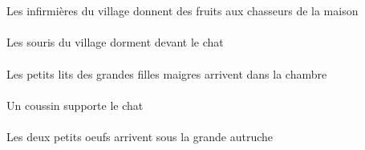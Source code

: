 \begin{exe}
\ex\gll
\DEFSgObl{}   \maisonDSgObl{}   \DE{}   \DEFPlErg{}    \DEFSgObl{}   \villageCSgObl{}   \DE{}   \infirmiereAPlErg{}    \DEFPlDat{}   \chasseurCPlDat{}   \INDPlAbs{}   \fruitAPlAbs{}  \donnerVdPrsAPl{}\\
\DEFSgOblP{}   \maisonDSgOblP{}   \DEP{}   \DEFPlErgP{}    \DEFSgOblP{}   \villageCSgOblP{}   \DEP{}   \infirmiereAPlErgP{}    \DEFPlDatP{}   \chasseurCPlDatP{}   \INDPlAbsP{}   \fruitAPlAbsP{}  \donnerVdPrsAPlP{}\\
Les infirmières du village donnent des fruits aux chasseurs de la maison
\ex\gll
\DEFPlAbs{}    \DEFSgObl{}   \villageCSgObl{}   \DE{}   \sourisBPlAbs{}    \DEFSgObl{}   \chatDSgObl{}   \DEVANT{}  \dormirViPrsBPl{}\\
\DEFPlAbsP{}    \DEFSgOblP{}   \villageCSgOblP{}   \DEP{}   \sourisBPlAbsP{}    \DEFSgOblP{}   \chatDSgOblP{}   \DEVANTP{}  \dormirViPrsBPlP{}\\
Les souris du village dorment devant le chat
\ex\gll
\DEFPlAbs{}    \DEFPlObl{}   \grandCPl{}   \maigreCPl{}   \filleCPlObl{}   \DE{}   \petitDPl{}   \litDPlAbs{}    \DEFSgObl{}   \chambreBSgObl{}   \DANS{}  \arriverViPrsDPl{}\\
\DEFPlAbsP{}    \DEFPlOblP{}   \grandCPlP{}   \maigreCPlP{}   \filleCPlOblP{}   \DEP{}   \petitDPlP{}   \litDPlAbsP{}    \DEFSgOblP{}   \chambreBSgOblP{}   \DANSP{}  \arriverViPrsDPlP{}\\
Les petits lits des grandes filles maigres arrivent dans la chambre
\ex\gll
\INDSgErg{}   \coussinBSgErg{}   \DEFSgAbs{}   \chatDSgAbs{}  \supporterVtPrsDSg{}\\
\INDSgErgP{}   \coussinBSgErgP{}   \DEFSgAbsP{}   \chatDSgAbsP{}  \supporterVtPrsDSgP{}\\
Un coussin supporte le chat
\ex\gll
\DEFDuAbs{}   \petitCDu{}   \oeufCDuAbs{}    \DEFSgObl{}   \grandBSg{}   \autrucheBSgObl{}   \SOUS{}  \arriverViPrsCDu{}\\
\DEFDuAbsP{}   \petitCDuP{}   \oeufCDuAbsP{}    \DEFSgOblP{}   \grandBSgP{}   \autrucheBSgOblP{}   \SOUSP{}  \arriverViPrsCDuP{}\\
Les deux petits oeufs arrivent sous la grande autruche
\ex\gll
\DEFSgObl{}   \cuisineDSgObl{}   \DANS{}   \DEMPlErg{}   \troisDPl{}   \chatDPlErg{}   \DEFSgAbs{}    \INDSgObl{}   \KatishaASgObl{}   \DE{}   \theBSgAbs{}  \boireVtPstBSg{}\\
\DEFSgOblP{}   \cuisineDSgOblP{}   \DANSP{}   \DEMPlErgP{}   \troisDPlP{}   \chatDPlErgP{}   \DEFSgAbsP{}    \INDSgOblP{}   \KatishaASgOblP{}   \DEP{}   \theBSgAbsP{}  \boireVtPstBSgP{}\\

\end{exe}
